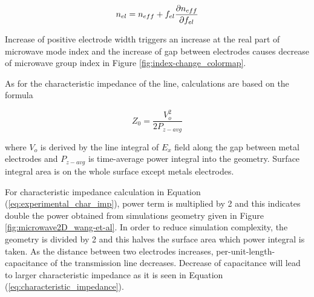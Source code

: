 	\begin{equation}
		n_{el} = n_{eff} + f_{el} \pdv{n_{eff}}{f_{el}}
		\label{eq:neff_to_ng}
	\end{equation}   
	
	\newpage    
	Increase of positive electrode width triggers an increase at the real part of microwave mode index and the increase of gap between electrodes causes decrease of microwave group index in Figure \ref{fig:index-change_colormap}. 
	
	
    As for the characteristic impedance of the line, calculations are based on the formula 
    
    \begin{equation}
    	Z_0 = \frac{V_o^2}{2P_{z-avg}}
    	\label{eq:experimental_char_imp}
    \end{equation}
    
    where $V_o$ is derived by the line integral of $E_x$ field along the gap between metal electrodes and $P_{z-avg}$ is time-average power integral into the geometry. Surface integral area is on the whole surface except metals electrodes. 
    
    For characteristic impedance calculation in Equation (\ref{eq:experimental_char_imp}), power term is multiplied by 2 and this indicates double the power obtained from simulations geometry given in Figure \ref{fig:microwave2D_wang-et-al}. In order to reduce simulation complexity, the geometry is divided by 2 and this halves the surface area which power integral is taken.
    As the distance between two electrodes increases, per-unit-length-capacitance of the transmission line decreases.  Decrease of capacitance will lead to larger characteristic impedance as it is seen in Equation (\ref{eq:characteristic_impedance}). 
    
